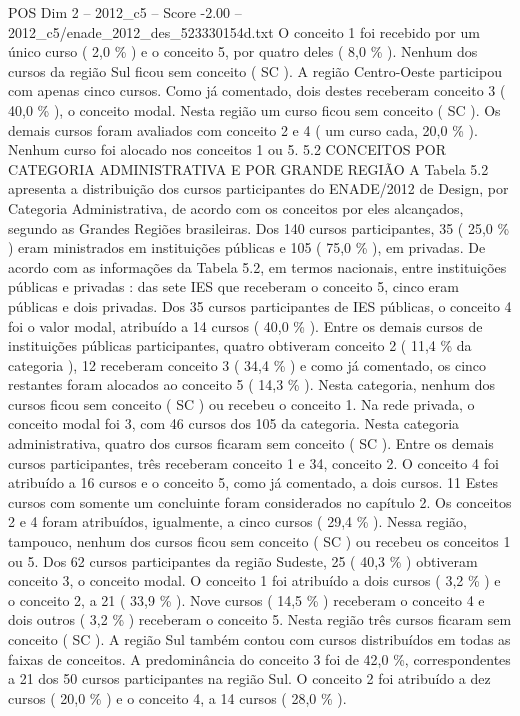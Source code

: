 \begin{textsample}{POS Dim 2 – 2012\_c5 – Score -2.00 – 2012\_c5/enade\_2012\_des\_523330154d.txt}
O conceito 1 foi recebido por um único curso ( 2,0 \% ) e o conceito 5, por quatro deles ( 8,0 \% ).
Nenhum dos cursos da região Sul ficou sem conceito ( SC ).
A região Centro-Oeste participou com apenas cinco cursos.
Como já comentado, dois destes receberam conceito 3 ( 40,0 \% ), o conceito modal.
Nesta região um curso ficou sem conceito ( SC ).
Os demais cursos foram avaliados com conceito 2 e 4 ( um curso cada, 20,0 \% ).
Nenhum curso foi alocado nos conceitos 1 ou 5. 5.2 CONCEITOS POR CATEGORIA ADMINISTRATIVA E POR GRANDE REGIÃO A Tabela 5.2 apresenta a distribuição dos cursos participantes do ENADE/2012 de Design, por Categoria Administrativa, de acordo com os conceitos por eles alcançados, segundo as Grandes Regiões brasileiras.
Dos 140 cursos participantes, 35 ( 25,0 \% ) eram ministrados em instituições públicas e 105 ( 75,0 \% ), em privadas.
De acordo com as informações da Tabela 5.2, em termos nacionais, entre instituições públicas e privadas : das sete IES que receberam o conceito 5, cinco eram públicas e dois privadas.
Dos 35 cursos participantes de IES públicas, o conceito 4 foi o valor modal, atribuído a 14 cursos ( 40,0 \% ).
Entre os demais cursos de instituições públicas participantes, quatro obtiveram conceito 2 ( 11,4 \% da categoria ), 12 receberam conceito 3 ( 34,4 \% ) e como já comentado, os cinco restantes foram alocados ao conceito 5 ( 14,3 \% ).
Nesta categoria, nenhum dos cursos ficou sem conceito ( SC ) ou recebeu o conceito 1.
Na rede privada, o conceito modal foi 3, com 46 cursos dos 105 da categoria.
Nesta categoria administrativa, quatro dos cursos ficaram sem conceito ( SC ).
Entre os demais cursos participantes, três receberam conceito 1 e 34, conceito 2.
O conceito 4 foi atribuído a 16 cursos e o conceito 5, como já comentado, a dois cursos. 11 Estes cursos com somente um concluinte foram considerados no capítulo 2.
Os conceitos 2 e 4 foram atribuídos, igualmente, a cinco cursos ( 29,4 \% ).
Nessa região, tampouco, nenhum dos cursos ficou sem conceito ( SC ) ou recebeu os conceitos 1 ou 5.
Dos 62 cursos participantes da região Sudeste, 25 ( 40,3 \% ) obtiveram conceito 3, o conceito modal.
O conceito 1 foi atribuído a dois cursos ( 3,2 \% ) e o conceito 2, a 21 ( 33,9 \% ).
Nove cursos ( 14,5 \% ) receberam o conceito 4 e dois outros ( 3,2 \% ) receberam o conceito 5.
Nesta região três cursos ficaram sem conceito ( SC ).
A região Sul também contou com cursos distribuídos em todas as faixas de conceitos.
A predominância do conceito 3 foi de 42,0 \%, correspondentes a 21 dos 50 cursos participantes na região Sul.
O conceito 2 foi atribuído a dez cursos ( 20,0 \% ) e o conceito 4, a 14 cursos ( 28,0 \% ).

\end{textsample}
